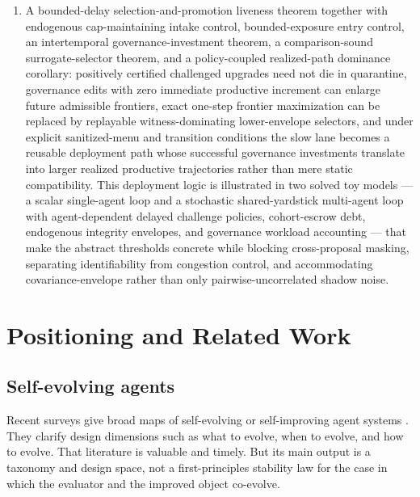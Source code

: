 \documentclass[11pt]{article}
\theoremstyle{definition}
\newcommand{\1}{\mathbf{1}}
\begin{document}
\begin{enumerate}[leftmargin=1.8em]
  \item A bounded-delay selection-and-promotion liveness theorem together with endogenous cap-maintaining intake control, bounded-exposure entry control, an intertemporal governance-investment theorem, a comparison-sound surrogate-selector theorem, and a policy-coupled realized-path dominance corollary: positively certified challenged upgrades need not die in quarantine, governance edits with zero immediate productive increment can enlarge future admissible frontiers, exact one-step frontier maximization can be replaced by replayable witness-dominating lower-envelope selectors, and under explicit sanitized-menu and transition conditions the slow lane becomes a reusable deployment path whose successful governance investments translate into larger realized productive trajectories rather than mere static compatibility. This deployment logic is illustrated in two solved toy models --- a scalar single-agent loop and a stochastic shared-yardstick multi-agent loop with agent-dependent delayed challenge policies, cohort-escrow debt, endogenous integrity envelopes, and governance workload accounting --- that make the abstract thresholds concrete while blocking cross-proposal masking, separating identifiability from congestion control, and accommodating covariance-envelope rather than only pairwise-uncorrelated shadow noise.
\end{enumerate}

\section{Positioning and Related Work}
\subsection{Self-evolving agents}
Recent surveys give broad maps of self-evolving or self-improving agent systems \cite{SelfEvolvingSurvey2025}. They clarify design dimensions such as what to evolve, when to evolve, and how to evolve. That literature is valuable and timely. But its main output is a taxonomy and design space, not a first-principles stability law for the case in which the evaluator and the improved object co-evolve.
\end{document}
